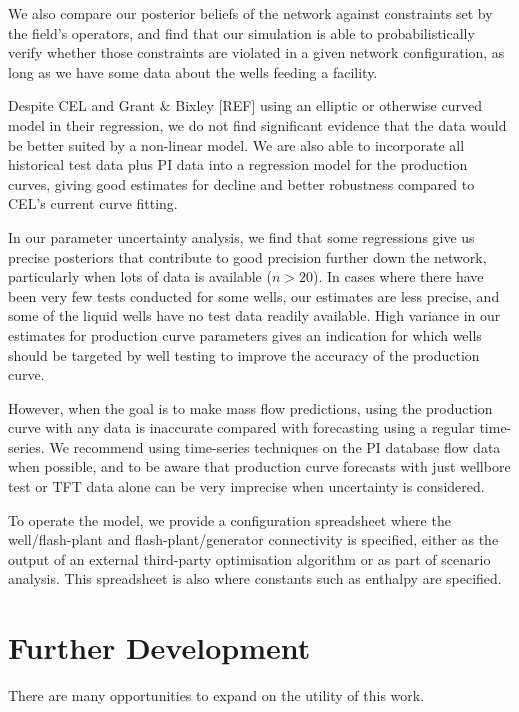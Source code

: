 \documentclass[a4paper, 12pt]{article}
\begin{document}
We also compare our posterior beliefs of the network against constraints set by the field's operators, and find that our simulation is able to probabilistically verify whether those constraints are violated in a given network configuration, as long as we have some data about the wells feeding a facility.

Despite CEL and Grant \& Bixley [REF] using an elliptic or otherwise curved model in their regression, we do not find significant evidence that the data would be better suited by a non-linear model. We are also able to incorporate all historical test data plus PI data into a regression model for the production curves, giving good estimates for decline and better robustness compared to CEL's current curve fitting.

In our parameter uncertainty analysis, we find that some regressions give us precise posteriors that contribute to good precision further down the network, particularly when lots of data is available ($n>20$). In cases where there have been very few tests conducted for some wells, our estimates are less precise, and some of the liquid wells have no test data readily available. High variance in our estimates for production curve parameters gives an indication for which wells should be targeted by well testing to improve the accuracy of the production curve.

However, when the goal is to make mass flow predictions, using the production curve with any data is inaccurate compared with forecasting using a regular time-series. We recommend using time-series techniques on the PI database flow data when possible, and to be aware that production curve forecasts with just wellbore test or TFT data alone can be very imprecise when uncertainty is considered.

To operate the model, we provide a configuration spreadsheet where the well/flash-plant and flash-plant/generator connectivity is specified, either as the output of an external third-party optimisation algorithm or as part of scenario analysis. This spreadsheet is also where constants such as enthalpy are specified.


\section{Further Development}
There are many opportunities to expand on the utility of this work.
\end{document}
